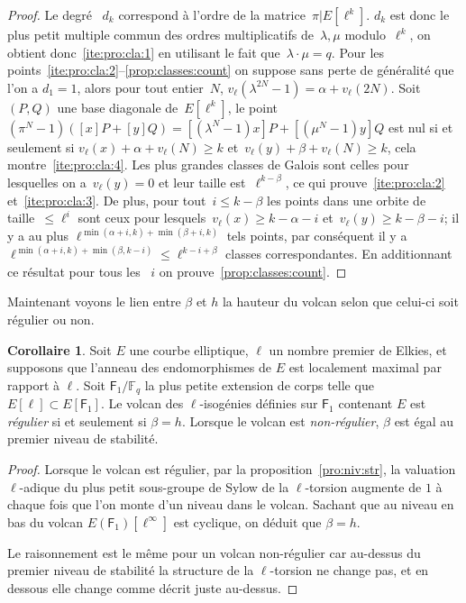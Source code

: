 \documentclass[10pt,a4paper]{book}
\theoremstyle{plain}
\theoremstyle{definition}
\theoremstyle{definition}
\newtheorem{cor}[thm]{Corollaire}
\theoremstyle{definition}
\theoremstyle{definition}
\theoremstyle{remark}
\theoremstyle{remark}
\theoremstyle{definition}
\begin{document}
\begin{proof}
Le degré ~$d_k$ correspond à l'ordre de la matrice~$\pi|E[\ell^k]$.
$d_k$ est donc le plus petit multiple commun des ordres multiplicatifs
de~$\lambda, \mu$ modulo~$\ell^k$,
on obtient donc~\eqref{ite:pro:cla:1} en utilisant le fait que~$\lambda \cdot \mu = q$.
Pour les points~\eqref{ite:pro:cla:2}--\eqref{prop:classes:count} on suppose sans perte de généralité que l'on a $d_1 = 1$,
alors pour tout entier~$N$, $v_{\ell}(\lambda^{2N}-1) = \alpha + v_{\ell} (2N)$.
Soit~$(P, Q)$ une base diagonale de~$E[\ell^k]$,
le point $(\pi^N - 1) ([x] P + [y] Q) = [(\lambda^N-1) x] P + [(\mu^N-1) y] Q$
est nul si et seulement si $v_{\ell} (x) + \alpha + v_{\ell} (N) \geq k$
et~$v_{\ell} (y) + \beta + v_{\ell} (N) \geq k$, cela montre~\eqref{ite:pro:cla:4}.
Les plus grandes classes de Galois sont celles pour lesquelles
on a~$v_{\ell} (y) = 0$ et leur taille est~$\ell^{k - \beta}$,
ce qui prouve~\eqref{ite:pro:cla:2} et~\eqref{ite:pro:cla:3}.
De plus, pour tout~$i \leq k-\beta$ les points dans une orbite de taille~$\leqslant \ell^i$
sont ceux pour lesquels~$v_{\ell} (x) \geqslant k - \alpha - i$ et~$v_{\ell} (y) \geqslant k - \beta - i$;
il y a au plus $\ell^{\min(\alpha+i, k) + \min (\beta+i, k)}$ tels points,
par conséquent il y a $\ell^{\min(\alpha+i, k) + \min(\beta, k-i)} \leqslant \ell^{k-i+\beta}$
 classes correspondantes.
En additionnant ce résultat pour tous les ~$i$ on prouve~\eqref{prop:classes:count}.
\end{proof}

Maintenant voyons le lien entre $\beta$ et $h$ la hauteur du volcan selon que
celui-ci soit régulier ou non.

\begin{cor}
\label{cor:elk:bet:reg}
Soit $E$ une courbe elliptique, $\ell$ un nombre premier de Elkies, et
supposons que l'anneau des endomorphismes de $E$ est localement
maximal par rapport à $\ell$. Soit $\mathsf{F}_1/\mathbb{F}_q$ la plus
petite extension de corps telle que $E[\ell] \subset E[\mathsf{F}_1]$.
Le volcan des $\ell$-isogénies définies sur $\mathsf{F}_1$ contenant
$E$ est \emph{régulier} si et seulement si $\beta=h$.  Lorsque le
volcan est \emph{non-régulier}, $\beta$ est égal au premier niveau de
stabilité.
\end{cor}

\begin{proof}
Lorsque le volcan est régulier, par la proposition~\ref{pro:niv:str}, la 
valuation $\ell$-adique du plus petit sous-groupe de Sylow  de la $\ell$-torsion
augmente de $1$ à chaque fois que l'on monte d'un niveau dans le volcan. Sachant
que au niveau en bas du volcan $E(\mathsf{F}_1)[\ell^{\infty}]$ est 
cyclique, on déduit que $\beta=h$.

Le raisonnement est le même pour un volcan non-régulier car au-dessus du 
premier niveau de stabilité la structure de la $\ell$-torsion ne change pas, et 
en dessous elle change comme décrit juste au-dessus.
\end{proof}
\end{document}
